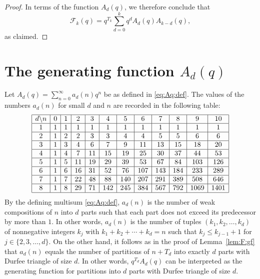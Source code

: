 \documentclass[11pt]{article}
\theoremstyle{plain}
\theoremstyle{definition}
\begin{document}
\begin{proof}
  In terms of the function $A_d (q)$, we therefore conclude that
  \begin{equation*}
    \mathcal{F}_k (q) = q^{T_k} \sum_{d = 0}^k q^d A_d (q) A_{k - d} (q),
  \end{equation*}
  as claimed.
\end{proof}

\section{The generating function \texorpdfstring{$A_d (q)$}{Ad(q)}}\label{sec:Ad}

Let $A_d (q) = \sum_{n = 0}^{\infty} a_d (n) q^n$ be as defined in
\eqref{eq:Aq:def}. The values of the numbers $a_d (n)$ for small $d$ and $n$
are recorded in the following table:
\begin{equation*}
  \begin{array}{|c|c|c|c|c|c|c|c|c|c|c|c|}
     \hline
     d\backslash n & 0 & 1 & 2 & 3 & 4 & 5 & 6 & 7 & 8 & 9 & 10\\
     \hline
     1 & 1 & 1 & 1 & 1 & 1 & 1 & 1 & 1 & 1 & 1 & 1\\
     \hline
     2 & 1 & 2 & 2 & 3 & 3 & 4 & 4 & 5 & 5 & 6 & 6\\
     \hline
     3 & 1 & 3 & 4 & 6 & 7 & 9 & 11 & 13 & 15 & 18 & 20\\
     \hline
     4 & 1 & 4 & 7 & 11 & 15 & 19 & 25 & 30 & 37 & 44 & 53\\
     \hline
     5 & 1 & 5 & 11 & 19 & 29 & 39 & 53 & 67 & 84 & 103 & 126\\
     \hline
     6 & 1 & 6 & 16 & 31 & 52 & 76 & 107 & 143 & 184 & 233 & 289\\
     \hline
     7 & 1 & 7 & 22 & 48 & 88 & 140 & 207 & 291 & 389 & 508 & 646\\
     \hline
     8 & 1 & 8 & 29 & 71 & 142 & 245 & 384 & 567 & 792 & 1069 & 1401\\
     \hline
   \end{array}
\end{equation*}
By the defining multisum \eqref{eq:Aq:def}, $a_d (n)$ is the number of weak
compositions of $n$ into $d$ parts such that each part does not exceed its
predecessor by more than $1$. In other words, $a_d (n)$ is the number of
tuples $(k_1, k_2, \ldots, k_d)$ of nonnegative integers $k_j$ with $k_1 + k_2
+ \cdots + k_d = n$ such that $k_j \leq k_{j - 1} + 1 $ for $j \in \{ 2,
3, \ldots, d \}$. On the other hand, it follows as in the proof of
Lemma~\ref{lem:F:gf} that $a_d (n)$ equals the number of partitions of $n +
T_d$ into exactly $d$ parts with Durfee triangle of size $d$. In other words,
$q^{T_d} A_d (q)$ can be interpreted as the generating function for partitions
into $d$ parts with Durfee triangle of size $d$.
\end{document}
